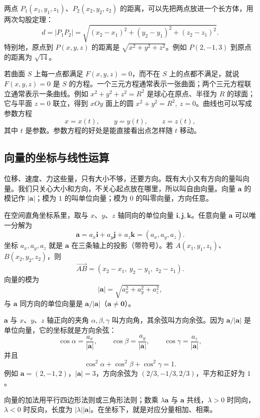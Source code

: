 两点 \(P_1(x_1,y_1,z_1)\)、\(P_2(x_2,y_2,z_2)\) 的距离，可以先把两点放进一个长方体，用两次勾股定理：
\[
d=\lvert P_1P_2\rvert
=\sqrt{(x_2-x_1)^2+(y_2-y_1)^2+(z_2-z_1)^2}.
\]
特别地，原点到 \(P(x,y,z)\) 的距离是 \(\sqrt{x^2+y^2+z^2}\)。例如 \(P(2,-1,3)\) 到原点的距离为 \(\sqrt{14}\)。

若曲面 \(S\) 上每一点都满足 \(F(x,y,z)=0\)，而不在 \(S\) 上的点都不满足，就说 \(F(x,y,z)=0\) 是 \(S\) 的方程。一个三元方程通常表示一张曲面；两个三元方程联立通常表示一条曲线。例如 \(x^2+y^2+z^2=R^2\) 是球心在原点、半径为 \(R\) 的球面；它与平面 \(z=0\) 联立，得到 \(xOy\) 面上的圆 \(x^2+y^2=R^2,\ z=0\)。曲线也可以写成参数方程
\[
x=x(t),\qquad y=y(t),\qquad z=z(t),
\]
其中 \(t\) 是参数。参数方程的好处是能直接看出点怎样随 \(t\) 移动。

\subsection{向量的坐标与线性运算}

位移、速度、力这些量，只有大小不够，还要方向。既有大小又有方向的量叫向量。我们只关心大小和方向，不关心起点放在哪里，所以叫自由向量。向量 \(\mathbf a\) 的模记作 \(\lvert\mathbf a\rvert\)；模为 \(1\) 的叫单位向量；模为 \(0\) 的叫零向量，方向任意。

在空间直角坐标系里，取与 \(x\)、\(y\)、\(z\) 轴同向的单位向量 \(\mathbf i,\mathbf j,\mathbf k\)。任意向量 \(\mathbf a\) 可以唯一分解为
\[
\mathbf a=a_x\mathbf i+a_y\mathbf j+a_z\mathbf k=(a_x,a_y,a_z).
\]
坐标 \(a_x,a_y,a_z\) 就是 \(\mathbf a\) 在三条轴上的投影（带符号）。若 \(A(x_1,y_1,z_1)\)、\(B(x_2,y_2,z_2)\)，则
\[
\overrightarrow{AB}=(x_2-x_1,\ y_2-y_1,\ z_2-z_1).
\]
向量的模为
\[
\lvert\mathbf a\rvert=\sqrt{a_x^2+a_y^2+a_z^2},
\]
与 \(\mathbf a\) 同方向的单位向量是 \(\mathbf a/\lvert\mathbf a\rvert\)（\(\mathbf a\ne\mathbf 0\)）。

\(\mathbf a\) 与 \(x\)、\(y\)、\(z\) 轴正向的夹角 \(\alpha,\beta,\gamma\) 叫方向角，其余弦叫方向余弦。因为 \(\mathbf a/\lvert\mathbf a\rvert\) 是单位向量，它的坐标就是方向余弦：
\[
\cos\alpha=\frac{a_x}{\lvert\mathbf a\rvert},\qquad
\cos\beta=\frac{a_y}{\lvert\mathbf a\rvert},\qquad
\cos\gamma=\frac{a_z}{\lvert\mathbf a\rvert},
\]
并且
\[
\cos^2\alpha+\cos^2\beta+\cos^2\gamma=1.
\]
例如 \(\mathbf a=(2,-1,2)\)，\(\lvert\mathbf a\rvert=3\)，方向余弦为 \((2/3,-1/3,2/3)\)，平方和正好为 \(1\)。

向量的加法用平行四边形法则或三角形法则；数乘 \(\lambda\mathbf a\) 与 \(\mathbf a\) 共线，\(\lambda>0\) 时同向，\(\lambda<0\) 时反向，长度为 \(\lvert\lambda\rvert\lvert\mathbf a\rvert\)。在坐标下，就是对应分量相加、相乘。


